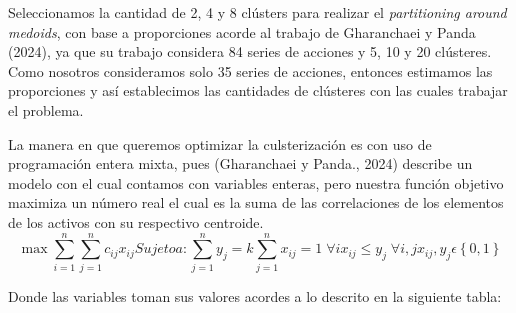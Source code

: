 \documentclass[
]{article}
\begin{document}
Seleccionamos la cantidad de 2, 4 y 8 clústers para realizar el
\emph{partitioning around medoids}, con base a proporciones acorde al
trabajo de Gharanchaei y Panda (2024), ya que su trabajo considera 84
series de acciones y 5, 10 y 20 clústeres. Como nosotros consideramos
solo 35 series de acciones, entonces estimamos las proporciones y así
establecimos las cantidades de clústeres con las cuales trabajar el
problema.

La manera en que queremos optimizar la culsterización es con uso de
programación entera mixta, pues (Gharanchaei y Panda., 2024)
describe un modelo con el cual contamos con variables enteras, pero
nuestra función objetivo maximiza un número real el cual es la suma de
las correlaciones de los elementos de los activos con su respectivo
centroide.
\begin{subequations}
	\begin{equation}
	\max\sum_{i = 1}^{n}{\sum_{j = 1}^{n}{c_{ij}x_{ij}}}
	\end{equation}
	Sujeto a:

	\begin{equation}
	\sum_{j = 1}^{n}y_{j} = k
	\end{equation}
	\begin{equation}
	\sum_{j = 1}^{n}x_{ij} = 1 \; \forall i
	\end{equation}
	\begin{equation}
	x_{ij} \leq y_{j} \; \forall i,j
	\end{equation}
	\begin{equation}
	x_{ij},y_{j}\epsilon\left\{ 0,1 \right\}
	\end{equation}
\end{subequations}

Donde las variables toman sus valores acordes a lo descrito en la
siguiente tabla:
\end{document}
